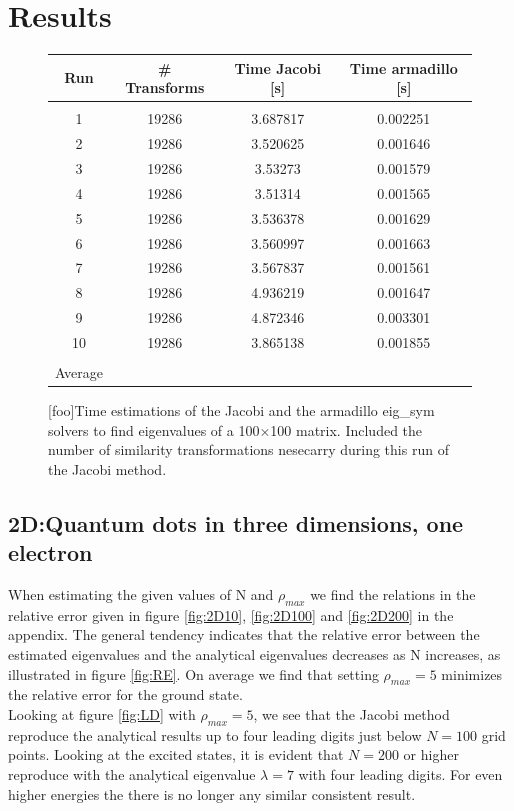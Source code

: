 \documentclass[%
reprint,
amsmath,amssymb,
aps,
]{revtex4-1}
\begin{document}
\section*{Results}
\begin{figure}[!h]
	\begin{tabular} {|c|c|c|c|}
		\hline
		Run & \# Transforms & Time Jacobi [s] & Time armadillo [s] \\ 
		\hline
		&&& \\ 
		1 & 19286 & 3.687817             & 0.002251            \\ 
		2 & 19286 & 3.520625             & 0.001646            \\ 
		3 & 19286 & 3.53273             & 0.001579            \\ 
		4 & 19286 & 3.51314             & 0.001565            \\ 
		5 & 19286 & 3.536378             & 0.001629            \\ 
		6 & 19286 & 3.560997             & 0.001663            \\ 
		7 & 19286 & 3.567837             & 0.001561            \\ 
		8 & 19286 & 4.936219             & 0.001647            \\ 
		9 & 19286 & 4.872346             & 0.003301            \\ 
		10 & 19286 & 3.865138             & 0.001855            \\ 
		\hline 
		& & &\\
		Average &&& \\ 
		\hline
	\end{tabular}
	\label{tab1}
	[foo]{Time estimations of the Jacobi and the armadillo eig\_sym solvers to find eigenvalues of a 100$\times$100 matrix. Included the number of similarity transformations nesecarry during this run of the Jacobi method.}
\end{figure}



\subsection*{2D:Quantum dots in three dimensions, one electron}
When estimating the given values of N and $\rho_{max}$ we find the relations in the relative error given in figure \ref{fig:2D10}, \ref{fig:2D100} and \ref{fig:2D200} in the appendix. The general tendency indicates that the relative error between the estimated eigenvalues and the analytical eigenvalues decreases as N increases, as illustrated in figure \ref{fig:RE}. On average we find that setting $\rho_{max} = 5$ minimizes the relative error for the ground state. \\
Looking at figure \ref{fig:LD} with $\rho_{max} = 5$, we see that the Jacobi method reproduce the analytical results up to four leading digits just below $N=100$ grid points. Looking at the excited states, it is evident that $N=200$  or higher reproduce with the analytical eigenvalue $\lambda = 7$ with four leading digits. For even higher energies the there is no longer any similar consistent result.
\end{document}
